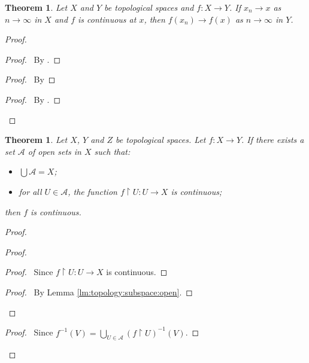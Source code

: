\documentclass{report}
\let\qed\relax
\newtheorem{thm}[lm]{Theorem}
\theoremstyle{definition}
\begin{document}
  \begin{thm}
    Let $X$ and $Y$ be topological spaces and $f : X \rightarrow Y$.
    If $x_n \rightarrow x$ as $n \rightarrow \infty$ in $X$ and $f$ is
    continuous
    at $x$, then $f(x_n)
    \rightarrow f(x)$ as $n \rightarrow \infty$ in $Y$.
  \end{thm}

  \begin{proof}
    \pf
    \begin{proof}
      \pf\ By .
    \end{proof}
    \begin{proof}
      \pf\ By 
    \end{proof}
    \begin{proof}
      \pf\ By .
    \end{proof}
    \qed
  \end{proof}

  \begin{thm}
    \label{thm:topology:continuous:local}
    Let $X$, $Y$ and $Z$ be topological spaces.
    Let $f : X \rightarrow Y$. If there exists a set $\mathcal{A}$ of open
    sets in
    $X$ such that:
    \begin{itemize}
      \item $\bigcup \mathcal{A} = X$;
      \item for all $U \in \mathcal{A}$, the function $f \restriction U : U
      \rightarrow X$ is continuous;
    \end{itemize}
    then $f$ is continuous.
  \end{thm}

  \begin{proof}
    \pf
    \begin{proof}
      \begin{proof}
        \pf\ Since $f \restriction U : U \rightarrow X$ is continuous.
      \end{proof}
      \qedstep
      \begin{proof}
        \pf\ By Lemma \ref{lm:topology:subspace:open}.
      \end{proof}
    \end{proof}
    \qedstep
    \begin{proof}
      \pf\ Since $f^{-1}(V) = \bigcup_{U \in \mathcal{A}} (f \restriction
      U)^{-1}(V)$.
    \end{proof}
  \end{proof}
\end{document}
